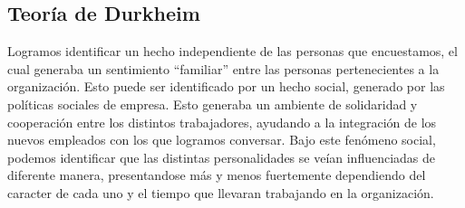 \subsection{Teoría de Durkheim}
	Logramos identificar un hecho independiente de las personas que encuestamos, el cual generaba un
	sentimiento ``familiar'' entre las personas pertenecientes a la organización. Esto puede ser identificado
	por un hecho social, generado por las políticas sociales de empresa. Esto generaba un ambiente de
	solidaridad y cooperación entre los distintos trabajadores, ayudando a la integración de los nuevos
	empleados con los que logramos conversar. Bajo este fenómeno social, podemos identificar que las
	distintas personalidades se veían influenciadas de diferente manera, presentandose más y menos
	fuertemente dependiendo del caracter de cada uno y el tiempo que llevaran trabajando en la
	organización.\\

